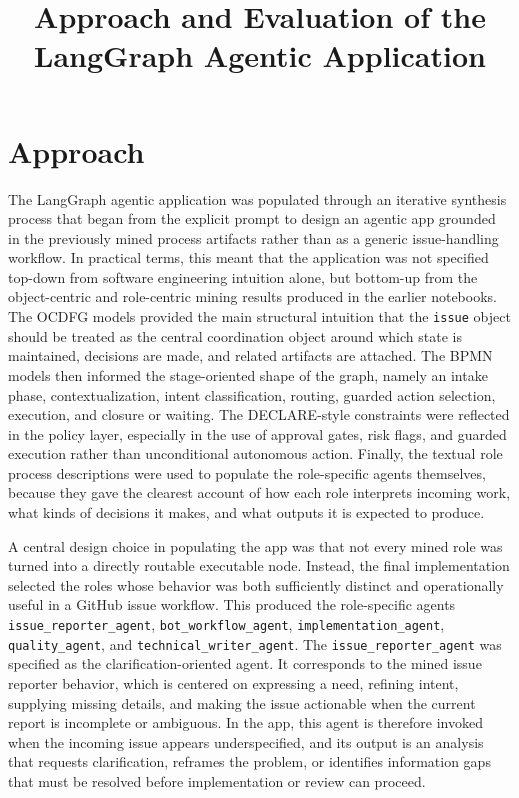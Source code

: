 \documentclass[11pt,a4paper]{article}
\title{Approach and Evaluation of the LangGraph Agentic Application}
\author{}
\date{}
\begin{document}
\maketitle

\section{Approach}

The LangGraph agentic application was populated through an iterative synthesis process that began from the explicit prompt to design an agentic app grounded in the previously mined process artifacts rather than as a generic issue-handling workflow. In practical terms, this meant that the application was not specified top-down from software engineering intuition alone, but bottom-up from the object-centric and role-centric mining results produced in the earlier notebooks. The OCDFG models provided the main structural intuition that the \texttt{issue} object should be treated as the central coordination object around which state is maintained, decisions are made, and related artifacts are attached. The BPMN models then informed the stage-oriented shape of the graph, namely an intake phase, contextualization, intent classification, routing, guarded action selection, execution, and closure or waiting. The DECLARE-style constraints were reflected in the policy layer, especially in the use of approval gates, risk flags, and guarded execution rather than unconditional autonomous action. Finally, the textual role process descriptions were used to populate the role-specific agents themselves, because they gave the clearest account of how each role interprets incoming work, what kinds of decisions it makes, and what outputs it is expected to produce.

A central design choice in populating the app was that not every mined role was turned into a directly routable executable node. Instead, the final implementation selected the roles whose behavior was both sufficiently distinct and operationally useful in a GitHub issue workflow. This produced the role-specific agents \texttt{issue\_reporter\_agent}, \texttt{bot\_workflow\_agent}, \texttt{implementation\_agent}, \texttt{quality\_agent}, and \texttt{technical\_writer\_agent}. The \texttt{issue\_reporter\_agent} was specified as the clarification-oriented agent. It corresponds to the mined issue reporter behavior, which is centered on expressing a need, refining intent, supplying missing details, and making the issue actionable when the current report is incomplete or ambiguous. In the app, this agent is therefore invoked when the incoming issue appears underspecified, and its output is an analysis that requests clarification, reframes the problem, or identifies information gaps that must be resolved before implementation or review can proceed.
\end{document}
